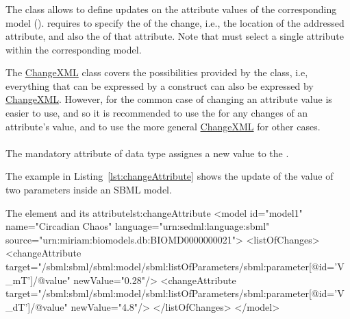 \subsubsection{}
\label{class:changeAttribute}
The  class allows to define updates on the attribute values of the corresponding model ().  requires to specify the \hyperref[sec:changeTarget]{} of the change, i.e., the location of the addressed attribute, and also the \hyperref[sec:newValue]{} of that attribute. Note that  must select a single attribute within the corresponding model.

The \hyperref[class:changeXml]{ChangeXML} class covers the possibilities provided by the  class, i.e, everything that can be expressed by a  construct can also be expressed by \hyperref[class:changeXml]{ChangeXML}. However, for the common case of changing an attribute value  is easier to use, and so it is recommended to use the  for any changes of an attribute's value, and to use the more general \hyperref[class:changeXml]{ChangeXML} for other cases.


\paragraph*{}
\label{sec:newValue}
The mandatory  attribute of data type  assignes a new value to the .

The example in Listing~\ref{lst:changeAttribute} shows the update of the value of two parameters inside an SBML model.

\begin{myXmlLst}{The  element and its  attribute}{lst:changeAttribute}
<model id="model1" name="Circadian Chaos" language="urn:sedml:language:sbml" 
	source="urn:miriam:biomodels.db:BIOMD0000000021">
	<listOfChanges>
		<changeAttribute target="/sbml:sbml/sbml:model/sbml:listOfParameters/sbml:parameter[@id='V_mT']/@value" newValue="0.28"/>
  		<changeAttribute target="/sbml:sbml/sbml:model/sbml:listOfParameters/sbml:parameter[@id='V_dT']/@value" newValue="4.8"/>
	</listOfChanges>
</model>
\end{myXmlLst}


